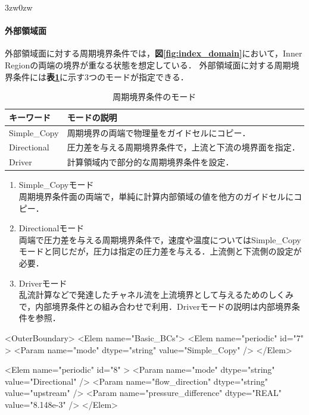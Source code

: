 \begin{indentation}{3zw}{0zw}

\paragraph{外部領域面}

外部領域面に対する周期境界条件では，\textbf{図\ref{fig:index_domain}}において，Inner\,Regionの両端の境界が重なる状態を想定している．
外部領域面に対する周期境界条件には\textbf{表\ref{tbl:periodic mode}}に示す3つのモードが指定できる．

\begin{table}[htdp]
\caption{周期境界条件のモード}
\begin{center}
\small
\begin{tabular}{ll} \toprule
キーワード & モードの説明\\ \midrule
Simple\_Copy & 周期境界の両端で物理量をガイドセルにコピー．\\
Directional  & 圧力差を与える周期境界条件で，上流と下流の境界面を指定．\\
Driver       & 計算領域内で部分的な周期境界条件を設定．\\ \bottomrule
\end{tabular}
\end{center}
\label{tbl:periodic mode}
\end{table}

\begin{enumerate}
\item Simple\_Copyモード\\
周期境界条件面の両端で，単純に計算内部領域の値を他方のガイドセルにコピー．
\item Directionalモード\\
両端で圧力差を与える周期境界条件で，速度や温度についてはSimple\_Copyモードと同じだが，圧力は指定の圧力差を与える．上流側と下流側の設定が必要．
\item Driverモード\\
乱流計算などで発達したチャネル流を上流境界として与えるためのしくみで，内部境界条件との組み合わせで利用．Driverモードの説明は内部境界条件を参照．
\end{enumerate}


{\small
\begin{program}
<OuterBoundary>
  <Elem name="Basic_BCs">
    <Elem name="periodic" id="7" >
      <Param name="mode" dtype="string" value="Simple_Copy" />
    </Elem>
      
    <Elem name="periodic" id="8" >
      <Param name="mode"                dtype="string" value="Directional" />
      <Param name="flow_direction"      dtype="string" value="upstream" />
      <Param name="pressure_difference" dtype="REAL"   value="8.148e-3" />
    </Elem>
      

\end{program}}
\end{indentation}
